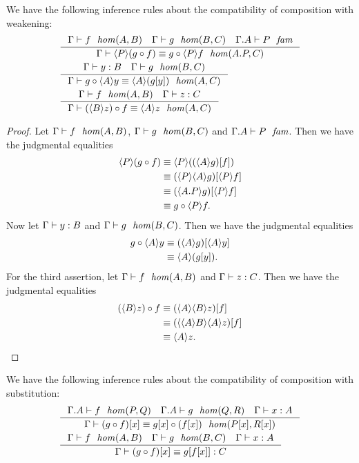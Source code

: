 \begin{lem}
We have the following inference rules about the compatibility of composition with
weakening:
\begin{align*}
& \inference
  {\jhom{\Gamma}{A}{B}{f}
   \jhom{\Gamma}{B}{C}{g}
   \jfam{{\Gamma}{A}}{P}}
  {\jhomeq{\Gamma}{{A}{P}}{C}
    {\ctxwk{P}{\jcomp{A}{f}{g}}}
    {\jcomp{{A}{P}}{\ctxwk{P}{f}}{g}}}\\
& \inference
  {\jterm{\Gamma}{B}{y}
   \jhom{\Gamma}{B}{C}{g}}
  {\jhomeq{\Gamma}{A}{C}
    {\jcomp{A}{\ctxwk{A}{y}}{g}}
    {\ctxwk{A}{\subst{y}{g}}}}\\
& \inference
  {\jhom{\Gamma}{A}{B}{f}
   \jterm{\Gamma}{C}{z}}
  {\jhomeq{\Gamma}{A}{C}
    {\jcomp{A}{f}{\ctxwk{B}{z}}}
    {\ctxwk{A}{z}}}
\end{align*}
\end{lem}

\begin{proof}
Let $\jhom{\Gamma}{A}{B}{f}$, $\jhom{\Gamma}{B}{C}{g}$ and $\jfam{{\Gamma}{A}}{P}$.
Then we have the judgmental equalities
\begin{align*}
\ctxwk{P}{\jcomp{A}{f}{g}} 
& \jdeq \ctxwk{P}{\subst{f}{\ctxwk{A}{g}}}\\
& \jdeq \subst{\ctxwk{P}{f}}{\ctxwk{P}{{A}{g}}}\\
& \jdeq \subst{\ctxwk{P}{f}}{\ctxwk{\ctxext{A}{P}}{g}}\\
& \jdeq \jcomp{{A}{P}}{\ctxwk{P}{f}}{g}.
\end{align*}
Now let $\jterm{\Gamma}{B}{y}$ and $\jhom{\Gamma}{B}{C}{g}$. Then we have the
judgmental equalities
\begin{align*}
\jcomp{A}{\ctxwk{A}{y}}{g}
& \jdeq \subst{\ctxwk{A}{y}}{\ctxwk{A}{g}}\\
& \jdeq \ctxwk{A}{\subst{y}{g}}.
\end{align*}
For the third assertion, let $\jhom{\Gamma}{A}{B}{f}$ and $\jterm{\Gamma}{C}{z}$.
Then we have the judgmental equalities
\begin{align*}
\jcomp{A}{f}{\ctxwk{B}{z}} 
& \jdeq \subst{f}{\ctxwk{A}{{B}{z}}}\\
& \jdeq \subst{f}{\ctxwk{{A}{B}}{{A}{z}}}\\
& \jdeq \ctxwk{A}{z}.
\end{align*}
\end{proof}

\begin{lem}
We have the following inference rules about the compatibility of composition with
substitution:
\begin{align*}
& \inference
  {\jhom{{\Gamma}{A}}{P}{Q}{f}
   \jhom{{\Gamma}{A}}{Q}{R}{g}
   \jterm{\Gamma}{A}{x}}
  {\jhomeq{\Gamma}{\subst{x}{P}}{\subst{x}{R}}
    {\subst{x}{\jcomp{P}{f}{g}}}
    {\jcomp{\subst{x}{P}}{\subst{x}{f}}{\subst{x}{g}}}}\\
& \inference
  {\jhom{\Gamma}{A}{B}{f}
   \jhom{\Gamma}{B}{C}{g}
   \jterm{\Gamma}{A}{x}}
  {\jtermeq{\Gamma}{C}
    {\subst{x}{\jcomp{A}{f}{g}}}
    {\subst{{x}{f}}{g}}}
\end{align*}
\end{lem}

